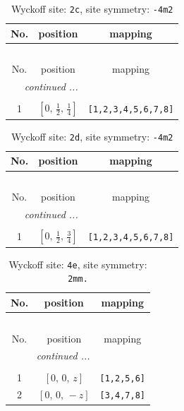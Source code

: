 \documentclass[fleqn,8pt]{jsarticle}
\begin{document}
\begin{longtable}{ccc}
\caption{Wyckoff site: {\tt 2c}, site symmetry: {\tt -4m2}}
 \\
 \hline \hline
No. & position & mapping \\ \hline \endfirsthead

\multicolumn{2}{l}{\tablename\ \thetable{}} \\
 \hline \hline
No. & position & mapping \\ \hline \endhead

 \hline \hline
\multicolumn{2}{r}{\footnotesize\it continued ...} \\ \endfoot

 \hline \hline
\multicolumn{2}{r}{} \\ \endlastfoot

1 & $\left[ 0,\, \frac{1}{2},\, \frac{1}{4} \right]$ & {\tt [1,2,3,4,5,6,7,8]} \\
\end{longtable}
\renewcommand{\arraystretch}{1.2}
\begin{longtable}{ccc}
\caption{Wyckoff site: {\tt 2d}, site symmetry: {\tt -4m2}}
 \\
 \hline \hline
No. & position & mapping \\ \hline \endfirsthead

\multicolumn{2}{l}{\tablename\ \thetable{}} \\
 \hline \hline
No. & position & mapping \\ \hline \endhead

 \hline \hline
\multicolumn{2}{r}{\footnotesize\it continued ...} \\ \endfoot

 \hline \hline
\multicolumn{2}{r}{} \\ \endlastfoot

1 & $\left[ 0,\, \frac{1}{2},\, \frac{3}{4} \right]$ & {\tt [1,2,3,4,5,6,7,8]} \\
\end{longtable}
\renewcommand{\arraystretch}{1.2}
\begin{longtable}{ccc}
\caption{Wyckoff site: {\tt 4e}, site symmetry: {\tt 2mm.}}
 \\
 \hline \hline
No. & position & mapping \\ \hline \endfirsthead

\multicolumn{2}{l}{\tablename\ \thetable{}} \\
 \hline \hline
No. & position & mapping \\ \hline \endhead

 \hline \hline
\multicolumn{2}{r}{\footnotesize\it continued ...} \\ \endfoot

 \hline \hline
\multicolumn{2}{r}{} \\ \endlastfoot

1 & $\left[ 0,\, 0,\, z \right]$ & {\tt [1,2,5,6]} \\ \hline
2 & $\left[ 0,\, 0,\, - z \right]$ & {\tt [3,4,7,8]} \\
\end{longtable}
\end{document}

